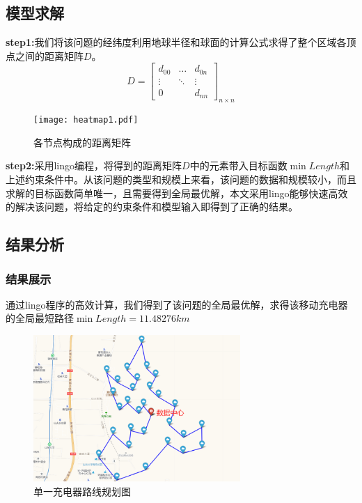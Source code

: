 \documentclass{whutmod}
\begin{document}
\subsection{模型求解}
\textbf{step1:}我们将该问题的经纬度利用地球半径和球面的计算公式求得了整个区域各顶点之间的距离矩阵$D$。
\begin{equation}
	D=\begin{bmatrix}
		d_{00} & \dots & d_{0n} \\
		\vdots & \ddots & \vdots \\
		0 & & d_{nn}
	\end{bmatrix}_{n \times n}
\end{equation}
\begin{figure}[!h]
	\centering
	\texttt{[image: heatmap1.pdf]}
	\caption{各节点构成的距离矩阵}
\end{figure}

\textbf{step2:}采用lingo编程，将得到的距离矩阵$D$中的元素带入目标函数$\min Length$和上述约束条件中。从该问题的类型和规模上来看，该问题的数据和规模较小，而且求解的目标函数简单唯一，且需要得到全局最优解，本文采用lingo能够快速高效的解决该问题，将给定的约束条件和模型输入即得到了正确的结果。
\subsection{结果分析}
\subsubsection{结果展示}
通过lingo程序的高效计算，我们得到了该问题的全局最优解，求得该移动充电器的全局最短路径$\min Length=11.48276km$
\begin{figure}[!h]
	\centering
	\includegraphics[width=0.7\textwidth]{route1.png}
	\caption{单一充电器路线规划图}
\end{figure}
\end{document}
